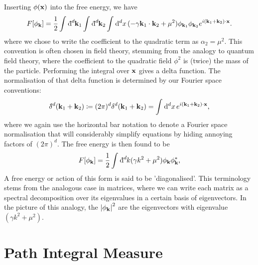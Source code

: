 Inserting $\phi(\vb{x})$ into the free energy, we have
\begin{equation}
  F[\phi_{\vb{k}}] = \frac{1}{2} \int_{}^{} \bdd[d]{\vb{k}_1} \int_{}^{} \bdd[d]{\vb{k}_2} \int_{}^{} \dd[d]{x} (-\gamma \vb{k}_1 \cdot \vb{k}_2 + \mu^2) \phi_{\vb{k}_1} \phi_{\vb{k}_2} e^{i(\vb{k}_1 + \vb{k}_2) \cdot \vb{x}}.
\end{equation}
where we chose to write the coefficient to the quadratic term as $\alpha_2 = \mu^2$. This convention is often chosen in field theory, stemming from the analogy to quantum field theory, where the coefficient to the quadratic field $\phi^2$ is (twice) the mass of the particle.
Performing the integral over $\vb{x}$ gives a delta function. The normalisation of that delta function is determined by our Fourier space conventions:
\begin{equation}
  \bdelta^d(\vb{k}_1 + \vb{k}_2) \coloneqq (2\pi)^d \delta^d(\vb{k}_1 + \vb{k}_2) = \int_{}^{} \dd[d]{x} e^{i(\vb{k}_1 + \vb{k}_2) \cdot \vb{x}},
\end{equation}
where we again use the horizontal bar notation to denote a Fourier space normalisation that will considerably simplify equations by hiding annoying factors of $(2\pi)^d$.
The free energy is then found to be
\begin{equation}
  F[\phi_{\vb{k}}] = \frac{1}{2} \int_{}^{} \bdd[d]{k} (\gamma k^2 + \mu^2) \phi_{\vb{k}} \phi^*_{\vb{k}},
\end{equation}
A free energy or action of this form is said to be 'diagonalised'. This terminology stems from the analogous case in matrices, where we can write each matrix as a spectral decomposition over its eigenvalues in a certain basis of eigenvectors.
In the picture of this analogy, the $\abs{\phi_{\vb{k}}}^2$ are the eigenvectors with eigenvalue $(\gamma k^2 + \mu^2)$.

\section{Path Integral Measure}%
\label{sec:path_integral_measure}

